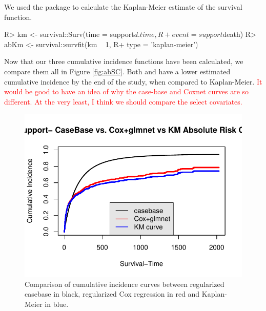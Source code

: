 \documentclass[
]{jss}
\begin{document}
We used the  package to calculate the Kaplan-Meier
estimate of the survival function.

\begin{CodeChunk}

\begin{CodeInput}
R> km <- survival::Surv(time = support$d.time, 
R+                      event = support$death)
R> abKm <- survival::survfit(km ~ 1,
R+                           type = 'kaplan-meier')
\end{CodeInput}
\end{CodeChunk}

Now that our three cumulative incidence functions have been calculated,
we compare them all in Figure \ref{fig:abSC}. Both  and
 have a lower estimated cumulative incidence by the end of
the study, when compared to Kaplan-Meier.
\textcolor{red}{It would be good to have an idea of why the case-base and Coxnet curves are so different. At the very least, I think we should compare the select covariates.}

\begin{CodeChunk}
\begin{figure}

{\centering \includegraphics{../figures/abSupportComparison-1} 

}

\caption{\label{fig:abSC} Comparison of cumulative incidence curves between regularized casebase in black, regularized Cox regression in red and Kaplan-Meier in blue.}\label{fig:abSupportComparison}
\end{figure}
\end{CodeChunk}
\end{document}
